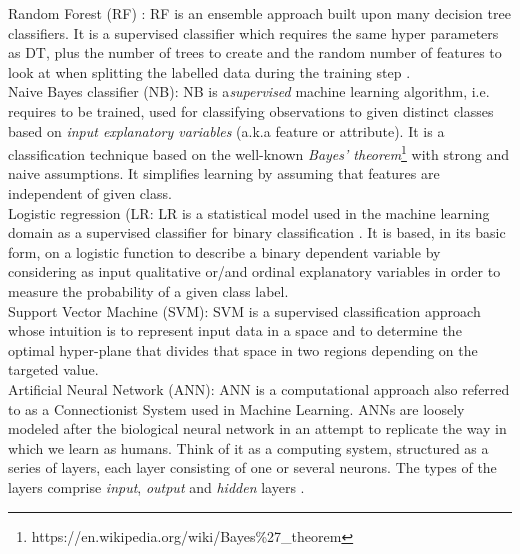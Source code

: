 Random Forest (RF) \cite{Be01}: RF is an ensemble approach built upon many decision tree classifiers. It is a supervised classifier which requires the same hyper parameters as DT, plus the number of trees to create and the random number of features to look at when splitting the labelled data during the training step \cite{Be01}.\\
Naive Bayes classifier (NB): NB\cite{Ka17} is a\emph{supervised} machine learning algorithm, i.e. requires to be trained, used for classifying observations to given distinct classes based on \emph{input explanatory variables} (a.k.a feature or attribute).
It is a classification technique based on the well-known \emph{Bayes’ theorem}\footnote{https://en.wikipedia.org/wiki/Bayes\%27\_theorem} with strong and naive assumptions. It simplifies learning by assuming that features are independent of given class.\\
Logistic regression (LR: LR \cite{Ph88} is a statistical model used in the machine learning domain as a supervised classifier for binary classification \cite{uddin2019comparing}. 
It is based, in its basic form, on a logistic function to describe a binary dependent variable\cite{wang2014support,de2018binary} by considering as input 
qualitative or/and ordinal explanatory variables  in order to measure the probability of a given class label. \\
Support Vector Machine (SVM): SVM \cite{Ev01} is a supervised classification approach whose intuition is to represent input data in a space and to determine the optimal hyper-plane that divides that space in two regions depending on the targeted value.\\
 Artificial Neural Network (ANN): ANN \cite{Me19} is a computational approach also referred to as a Connectionist System used in Machine Learning. ANNs are loosely modeled after the biological neural network in an attempt to replicate the way in which we learn as humans. Think of it as a computing system, structured as a series of layers, each layer consisting of one or several neurons. The types of the layers comprise \emph{input}, \emph{output} and \emph{hidden} layers \cite{anderson1972simple,raschka2015python}.

